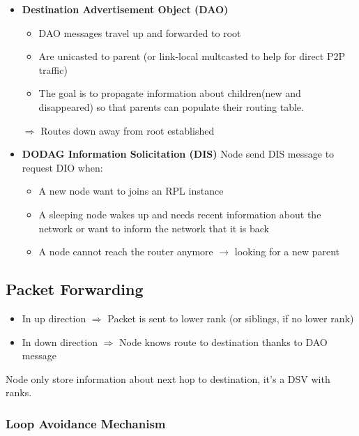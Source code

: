 \begin{itemize}
    \item \textbf{Destination Advertisement Object (DAO)}
        \begin{itemize}
            \item DAO messages travel up and forwarded to root
            \item Are unicasted to parent (or link-local multcasted to help for 
                direct P2P traffic)
            \item The goal is to propagate information about children(new and disappeared)
                so that parents can populate their routing table.
        \end{itemize}
        $\Rightarrow$ Routes down away from root established

    \item \textbf{DODAG Information Solicitation (DIS)}
        Node send DIS message to request DIO when:
        \begin{itemize}
            \item A new node want to joins an RPL instance
            \item A sleeping node wakes up and needs recent information
                about the network or want to inform the network that it is back
            \item A node cannot reach the router anymore $\to$ looking
                for a new parent
        \end{itemize}
\end{itemize}


\subsection{Packet Forwarding}
\begin{itemize}
    \item In up direction $\Rightarrow$ Packet is sent to lower rank (or
        siblings, if no lower rank)
    \item In down direction $\Rightarrow$ Node knows route to
        destination thanks to DAO message
\end{itemize}
Node only store information about next hop to destination, it's a DSV
with ranks.

\subsubsection{Loop Avoidance Mechanism}

